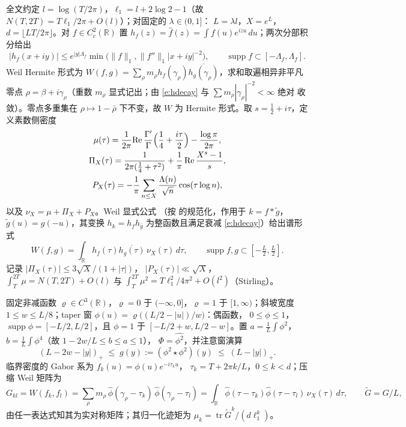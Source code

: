 \documentclass[11pt]{article}
\numberwithin{equation}{section}
\theoremstyle{definition}
\theoremstyle{remark}
\newcommand{\LL}{\Lambda}
\begin{document}
全文约定 $l=\log(T/2\pi)$，$\ell_1=l+2\log2-1$（故
$N(T,2T)=T\ell_1/2\pi+O(l)$）；对固定的 $\lambda\in(0,1]$：
$L=\lambda l$，$X=e^{L}$，$d=\lfloor LT/2\pi\rfloor$。对
$f\in C_c^{2}(\mathbb R)$ 置
$h_f(z)=\widehat f(z)=\int f(u)e^{izu}\,du$；两次分部积分给出
\begin{equation}\label{e:hdecay}
|h_f(x+iy)|\le e^{|y|\Lambda_f}
\min\bigl(\|f\|_1,\|f''\|_1|x+iy|^{-2}\bigr),
\qquad\operatorname{supp}f\subset[-\Lambda_f,\Lambda_f].
\end{equation}
Weil Hermite 形式为
$W(f,g)=\sum_{\rho}m_\rho h_f(\gamma_\rho)
\overline{h_g(\gamma_\rho)}$，求和取遍相异非平凡零点
$\rho=\beta+i\gamma_\rho$（重数 $m_\rho$ 显式记出；由
\eqref{e:hdecay} 与 $\sum m_\rho|\gamma_\rho|^{-2}<\infty$ 绝对
收敛）。零点多重集在 $\rho\mapsto1-\bar\rho$ 下不变，故 $W$ 为
Hermite 形式。取 $s=\tfrac12+i\tau$，定义素数侧密度
\begin{gather*}
\mu(\tau)=\frac1{2\pi}\mathrm{Re}\,
\frac{\Gamma'}{\Gamma}\Bigl(\frac14+\frac{i\tau}2\Bigr)
-\frac{\log\pi}{2\pi}, \\
\Pi_X(\tau)=\frac{1}{2\pi(\tfrac14+\tau^{2})}
+\frac1\pi\,\mathrm{Re}\,\frac{X^{s}-1}{s}, \\
P_X(\tau)=-\frac1\pi\sum_{n\le X}
\frac{\LL(n)}{\sqrt n}\cos(\tau\log n),
\end{gather*}
以及 $\nu_X=\mu+\Pi_X+P_X$。Weil 显式公式 \cite{Wei52}（按
\cite[定理~5.12]{IK} 的规范化，作用于 $k=f*\tilde g$，
$\tilde g(u)=g(-u)$，其变换 $h_k=h_fh_{\bar g}$ 为整函数且满足衰减
\eqref{e:hdecay}）给出谱形式
\begin{equation}\label{e:weil}
W(f,g)=\int_{\mathbb R}h_f(\tau)\overline{h_g(\tau)}\,
\nu_X(\tau)\,d\tau,
\qquad\operatorname{supp}f,g\subset[-\tfrac L2,\tfrac L2].
\end{equation}
记录 $|\Pi_X(\tau)|\le3\sqrt X/(1+|\tau|)$，
$|P_X(\tau)|\ll\sqrt X$，$\int_T^{2T}\mu=N(T,2T)+O(l)$ 与
$\int_T^{2T}\mu^{2}=T\ell_1^{2}/4\pi^{2}+O(l^{2})$（Stirling）。

固定非减函数 $\varrho\in C^{3}(\mathbb R)$，$\varrho=0$ 于
$(-\infty,0]$，$\varrho=1$ 于 $[1,\infty)$；斜坡宽度
$1\le w\le L/8$；taper 窗
$\phi(u)=\varrho\bigl((L/2-|u|)/w\bigr)$：偶函数，
$0\le\phi\le1$，$\operatorname{supp}\phi=[-L/2,L/2]$，且 $\phi=1$
于 $[-L/2+w,L/2-w]$。置 $a=\tfrac1L\int\phi^{2}$，
$b=\tfrac1L\int\phi^{4}$（故 $1-2w/L\le b\le a\le1$），
$\Phi=\widehat{\phi^{2}}$，并注意窗演算
\begin{equation}\label{e:windowcalc}
(L-2w-|y|)_+\;\le\;g(y):=(\phi^{2}\star\phi^{2})(y)
\;\le\;(L-|y|)_+ .
\end{equation}
临界密度的 Gabor 系为 $f_k(u)=\phi(u)e^{-i\tau_ku}$，
$\tau_k=T+2\pi k/L$，$0\le k<d$；压缩 Weil 矩阵为
\[
G_{kl}=W(f_k,f_l)
=\sum_\rho m_\rho\,\widehat\phi(\gamma_\rho-\tau_k)\,
\widehat\phi(\gamma_\rho-\tau_l)
=\int_{\mathbb R}\widehat\phi(\tau-\tau_k)
\widehat\phi(\tau-\tau_l)\,\nu_X(\tau)\,d\tau,
\qquad\widetilde G=G/L,
\]
由任一表达式知其为实对称矩阵；其归一化迹矩为
$\mu_k=\operatorname{tr}\widetilde G^{k}/(d\ell_1^{k})$。
\end{document}
